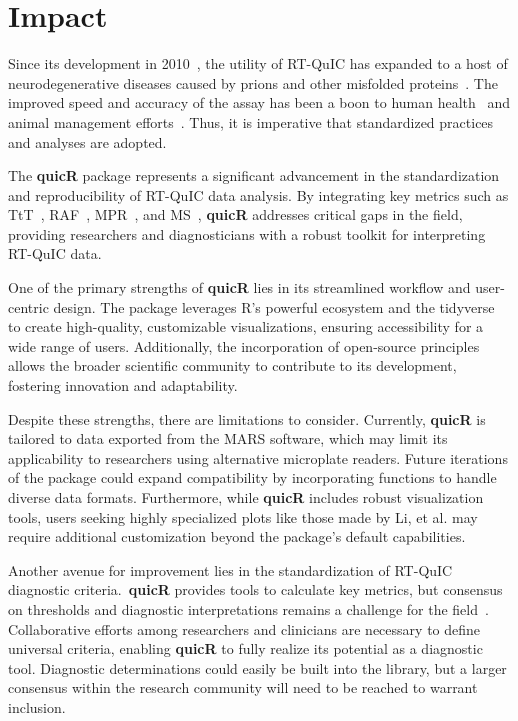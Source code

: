 \documentclass[preprint,12pt,a4paper]{elsarticle}
\begin{document}
    \section{Impact}
        Since its development in 2010~\cite{Wilham2010,Atarashi2011}, the utility of RT-QuIC has expanded to a host of neurodegenerative diseases caused by prions and other misfolded proteins~\cite{Orru2024,ALWAKIL202597,Wang2024}. The improved speed and accuracy of the assay has been a boon to human health~\cite{Orru2015,green2019rt,race2019transmission,vascellari2022real} and animal management efforts~\cite{huang2025chronic,cooper2019detection,piel2024validation,harpaz2024transmission}. Thus, it is imperative that standardized practices and analyses are adopted.

        The \textbf{quicR} package represents a significant advancement in the standardization and reproducibility of RT-QuIC data analysis. By integrating key metrics such as TtT~\cite{Orru2015}, RAF~\cite{Gallups2022}, MPR~\cite{Rowden2023}, and MS~\cite{Henderson2015}, \textbf{quicR} addresses critical gaps in the field, providing researchers and diagnosticians with a robust toolkit for interpreting RT-QuIC data.

        One of the primary strengths of \textbf{quicR} lies in its streamlined workflow and user-centric design. The package leverages R’s powerful ecosystem and the tidyverse~\cite{tidyverse2019} to create high-quality, customizable visualizations, ensuring accessibility for a wide range of users. Additionally, the incorporation of open-source principles allows the broader scientific community to contribute to its development, fostering innovation and adaptability.

        Despite these strengths, there are limitations to consider. Currently, \textbf{quicR} is tailored to data exported from the MARS software, which may limit its applicability to researchers using alternative microplate readers. Future iterations of the package could expand compatibility by incorporating functions to handle diverse data formats. Furthermore, while \textbf{quicR} includes robust visualization tools, users seeking highly specialized plots like those made by Li, et al.\cite{Li2025} may require additional customization beyond the package’s default capabilities.

        Another avenue for improvement lies in the standardization of RT-QuIC diagnostic criteria.\ \textbf{quicR} provides tools to calculate key metrics, but consensus on thresholds and diagnostic interpretations remains a challenge for the field~\cite{Rowden2023}. Collaborative efforts among researchers and clinicians are necessary to define universal criteria, enabling \textbf{quicR} to fully realize its potential as a diagnostic tool. Diagnostic determinations could easily be built into the library, but a larger consensus within the research community will need to be reached to warrant inclusion.
\end{document}
